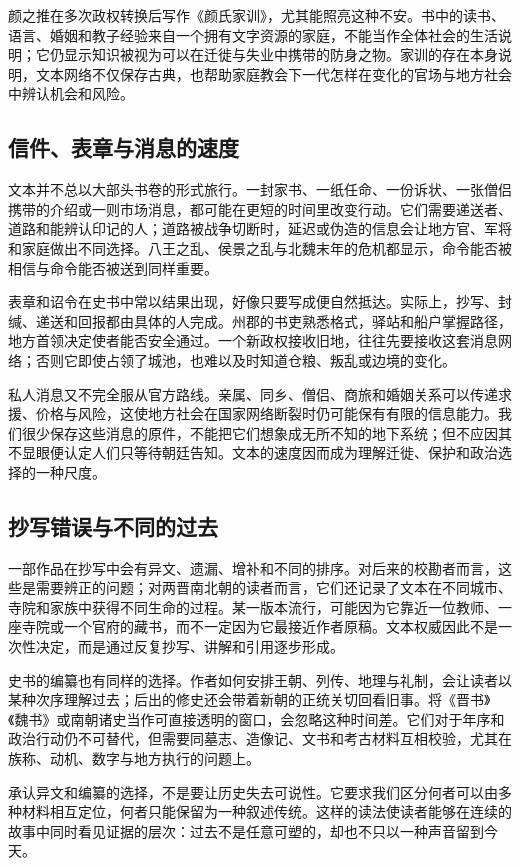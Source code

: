 颜之推在多次政权转换后写作《颜氏家训》，尤其能照亮这种不安。书中的读书、语言、婚姻和教子经验来自一个拥有文字资源的家庭，不能当作全体社会的生活说明；它仍显示知识被视为可以在迁徙与失业中携带的防身之物。家训的存在本身说明，文本网络不仅保存古典，也帮助家庭教会下一代怎样在变化的官场与地方社会中辨认机会和风险。

\subsection{信件、表章与消息的速度}

文本并不总以大部头书卷的形式旅行。一封家书、一纸任命、一份诉状、一张僧侣携带的介绍或一则市场消息，都可能在更短的时间里改变行动。它们需要递送者、道路和能辨认印记的人；道路被战争切断时，延迟或伪造的信息会让地方官、军将和家庭做出不同选择。八王之乱、侯景之乱与北魏末年的危机都显示，命令能否被相信与命令能否被送到同样重要。

表章和诏令在史书中常以结果出现，好像只要写成便自然抵达。实际上，抄写、封缄、递送和回报都由具体的人完成。州郡的书吏熟悉格式，驿站和船户掌握路径，地方首领决定使者能否安全通过。一个新政权接收旧地，往往先要接收这套消息网络；否则它即使占领了城池，也难以及时知道仓粮、叛乱或边境的变化。

私人消息又不完全服从官方路线。亲属、同乡、僧侣、商旅和婚姻关系可以传递求援、价格与风险，这使地方社会在国家网络断裂时仍可能保有有限的信息能力。我们很少保存这些消息的原件，不能把它们想象成无所不知的地下系统；但不应因其不显眼便认定人们只等待朝廷告知。文本的速度因而成为理解迁徙、保护和政治选择的一种尺度。

\subsection{抄写错误与不同的过去}

一部作品在抄写中会有异文、遗漏、增补和不同的排序。对后来的校勘者而言，这些是需要辨正的问题；对两晋南北朝的读者而言，它们还记录了文本在不同城市、寺院和家族中获得不同生命的过程。某一版本流行，可能因为它靠近一位教师、一座寺院或一个官府的藏书，而不一定因为它最接近作者原稿。文本权威因此不是一次性决定，而是通过反复抄写、讲解和引用逐步形成。

史书的编纂也有同样的选择。作者如何安排王朝、列传、地理与礼制，会让读者以某种次序理解过去；后出的修史还会带着新朝的正统关切回看旧事。将《晋书》《魏书》或南朝诸史当作可直接透明的窗口，会忽略这种时间差。它们对于年序和政治行动仍不可替代，但需要同墓志、造像记、文书和考古材料互相校验，尤其在族称、动机、数字与地方执行的问题上。

承认异文和编纂的选择，不是要让历史失去可说性。它要求我们区分何者可以由多种材料相互定位，何者只能保留为一种叙述传统。这样的读法使读者能够在连续的故事中同时看见证据的层次：过去不是任意可塑的，却也不只以一种声音留到今天。

